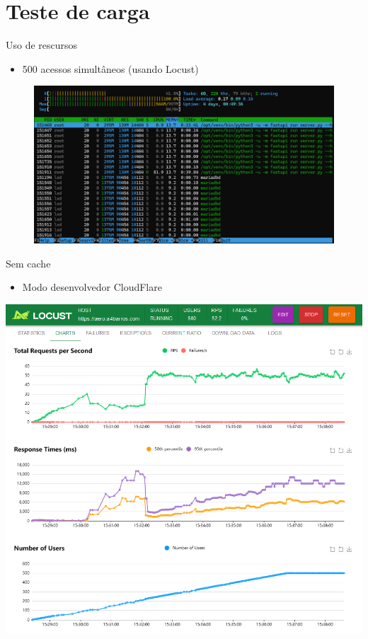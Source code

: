 \documentclass{beamer}
\begin{document}
\section{Teste de carga}

\begin{frame}{Uso de rescursos}
    \begin{itemize}
        \item 500 acessos simultâneos (usando Locust)
    \end{itemize}
    \pause
    
    \begin{figure}[ht]
        \begin{center}
        \includegraphics[width=0.8\linewidth]{img/server-500-acessos.png}
        \label{fig:arquitetura}
        \end{center}
    \end{figure}
\end{frame}

\begin{frame}{Sem cache}
    \begin{itemize}
        \item Modo desenvolvedor CloudFlare
    \end{itemize}    

    \begin{center}
        \includegraphics[width=0.6\linewidth]{img/locust-no-cache.png}
    \end{center}
\end{frame}
\end{document}
